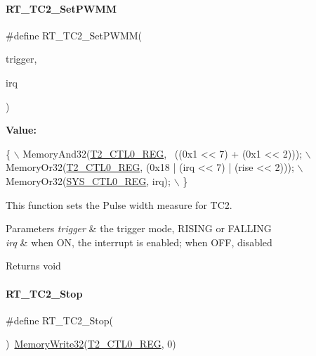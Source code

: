\paragraph{\texorpdfstring{R\+T\+\_\+\+T\+C2\+\_\+\+Set\+P\+W\+MM}{RT\_TC2\_SetPWMM}}
{\footnotesize\ttfamily \#define R\+T\+\_\+\+T\+C2\+\_\+\+Set\+P\+W\+MM(\begin{DoxyParamCaption}\item[{}]{trigger,  }\item[{}]{irq }\end{DoxyParamCaption})}

{\bfseries Value\+:}
\begin{DoxyCode}
\{                                                               \(\backslash\)
        MemoryAnd32(\mbox{\hyperlink{a00026_a5853553391e986211306d4f29ab31e47}{T2\_CTL0\_REG}}, ~((0x1 << 7) + (0x1 << 2)));       \(\backslash\)
        MemoryOr32(\mbox{\hyperlink{a00026_a5853553391e986211306d4f29ab31e47}{T2\_CTL0\_REG}}, (0x18 | (irq << 7) | (rise << 2))); \(\backslash\)
        MemoryOr32(\mbox{\hyperlink{a00026_ab34acec79daf4fcc12a662cde9e75df7}{SYS\_CTL0\_REG}}, irq);                              \(\backslash\)
    \}
\end{DoxyCode}


This function sets the Pulse width measure for T\+C2. 


\begin{DoxyParams}{Parameters}
{\em trigger} & the trigger mode, R\+I\+S\+I\+NG or F\+A\+L\+L\+I\+NG \\
\hline
{\em irq} & when ON, the interrupt is enabled; when O\+FF, disabled \\
\hline
\end{DoxyParams}
\begin{DoxyReturn}{Returns}
void 
\end{DoxyReturn}
\mbox{\label{a00083_a01042ab913ed15f70e6011c57dd9f6a0}} 
\paragraph{\texorpdfstring{R\+T\+\_\+\+T\+C2\+\_\+\+Stop}{RT\_TC2\_Stop}}
{\footnotesize\ttfamily \#define R\+T\+\_\+\+T\+C2\+\_\+\+Stop(\begin{DoxyParamCaption}{ }\end{DoxyParamCaption})~\mbox{\hyperlink{a00026_a6b9732365b12e48ddb89fe1028b975b0}{Memory\+Write32}}(\mbox{\hyperlink{a00026_a5853553391e986211306d4f29ab31e47}{T2\+\_\+\+C\+T\+L0\+\_\+\+R\+EG}}, 0)}



